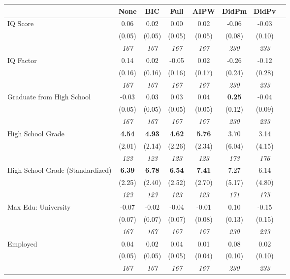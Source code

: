 \begin{tabular}{l c c c c c c c}
\toprule
 & None & BIC & Full & AIPW & DidPm & DidPv \\
\midrule
IQ Score & 0.06 & 0.02 & 0.00 & 0.02 & -0.06 & -0.03 \\
& (0.05) & (0.05) & (0.05) & (0.05) & (0.08) & (0.10) \\
& \textit{ 167 } & \textit{ 167 } & \textit{ 167 } & \textit{ 167 } & \textit{ 230 } & \textit{ 233 } \\
IQ Factor & 0.14 & 0.02 & -0.05 & 0.02 & -0.26 & -0.12 \\
& (0.16) & (0.16) & (0.16) & (0.17) & (0.24) & (0.28) \\
& \textit{ 167 } & \textit{ 167 } & \textit{ 167 } & \textit{ 167 } & \textit{ 230 } & \textit{ 233 } \\
Graduate from High School & -0.03 & 0.03 & 0.03 & 0.04 & \textbf{ 0.25 } & -0.04 \\
& (0.05) & (0.05) & (0.05) & (0.05) & (0.12) & (0.09) \\
& \textit{ 167 } & \textit{ 167 } & \textit{ 167 } & \textit{ 167 } & \textit{ 230 } & \textit{ 233 } \\
High School Grade & \textbf{ 4.54 } & \textbf{ 4.93 } & \textbf{ 4.62 } & \textbf{5.76} & 3.70 & 3.14 \\
& (2.01) & (2.14) & (2.26) & (2.34) & (6.04) & (4.15) \\
& \textit{ 123 } & \textit{ 123 } & \textit{ 123 } & \textit{ 123 } & \textit{ 173 } & \textit{ 176 } \\
High School Grade (Standardized) & \textbf{ 6.39 } & \textbf{ 6.78 } & \textbf{ 6.54 } & \textbf{7.41} & 7.27 & 6.14 \\
& (2.25) & (2.40) & (2.52) & (2.70) & (5.17) & (4.80) \\
& \textit{ 123 } & \textit{ 123 } & \textit{ 123 } & \textit{ 123 } & \textit{ 171 } & \textit{ 175 } \\
Max Edu: University & -0.07 & -0.02 & -0.04 & -0.01 & 0.10 & -0.15 \\
& (0.07) & (0.07) & (0.07) & (0.08) & (0.13) & (0.15) \\
& \textit{ 167 } & \textit{ 167 } & \textit{ 167 } & \textit{ 167 } & \textit{ 230 } & \textit{ 233 } \\
Employed & 0.04 & 0.02 & 0.04 & 0.01 & 0.08 & 0.02 \\
& (0.05) & (0.05) & (0.05) & (0.04) & (0.10) & (0.10) \\
& \textit{ 167 } & \textit{ 167 } & \textit{ 167 } & \textit{ 167 } & \textit{ 230 } & \textit{ 233 } \\

\end{tabular}
